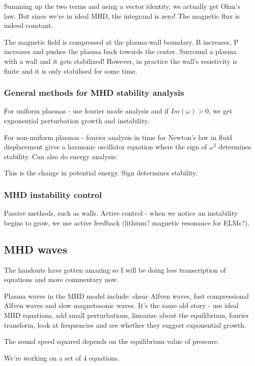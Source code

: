 \documentclass[PlasmaNotes.tex]{subfiles}
\begin{document}
Summing up the two terms and using a vector identity, we actually get Ohm's law. But since we're in ideal MHD, the integrand is zero! The magnetic flux is indeed constant.

The magnetic field is compressed at the plasma-wall boundary. B increases, P increases and pushes the plasma back towards the center. Surround a plasma with a wall and it gets stabilized! However, in practice the wall's resistivity is finite and it is only stabilised for some time.

\subsubsection{General methods for MHD stability analysis}

For uniform plasmas - use fourier mode analysis and if $Im(\omega)>0$, we get exponential perturbation growth and instability.

For non-uniform plasmas - fourier analysis in time for Newton's law in fluid displacement gives a harmonic oscillator equation where the sign of $\omega^2$ determines stability. Can also do energy analysis:

This is the change in potential energy. Sign determines stability.

\subsubsection{MHD instability control}
Passive methods, such as walls. Active control - when we notice an instability begins to grow, we use active feedback (lithium? magnetic resonance for ELMs?).

\subsection{MHD waves}
The handouts have gotten amazing so I will be doing less transcription of equations and more commentary now.

Plasma waves in the MHD model include: shear Alfven waves, fast compressional Alfven waves and slow magnetosonic waves. It's the same old story - use ideal MHD equations, add small perturbations, linearize about the equilibrium, fourier transform, look at frequencies and see whether they suggest exponential growth.

The sound speed squared depends on the equilibrium value of pressure.

We're working on a set of 4 equations.
\end{document}
